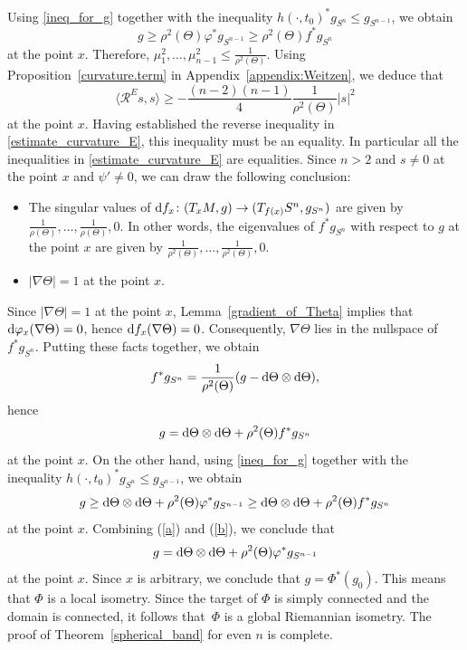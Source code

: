 Using \eqref{ineq_for_g} together with the inequality $h(\cdot,t_0)^* g_{S^n} \leq g_{S^{n-1}}$, we obtain
\[g \geq \rho^2(\Theta) \varphi^* g_{S^{n-1}} \geq \rho^2(\Theta) f^* g_{S^n}\]
at the point $x$.
Therefore, $\mu_1^2,\hdots,\mu_{n-1}^2 \leq \frac{1}{\rho^2(\Theta)}$.
Using Proposition~\ref{curvature.term} in Appendix~\ref{appendix:Weitzen}, we deduce that
\[
 \big\langle \mathcal{R}^E s ,s \big\rangle \geq -\frac{(n-2)(n-1)}{4} \frac{1}{\rho^2(\Theta)} |s|^2
\]
at the point $x$.
Having established the reverse inequality in \eqref{estimate_curvature_E}, this inequality must be an equality.
In particular all the inequalities in \eqref{estimate_curvature_E} are equalities.
Since $n>2$ and $s \neq 0$ at the point $x$ and $\psi'\neq0$, we can draw the following conclusion:
\begin{itemize}\itemsep=0pt
\item The singular values of ${\rm d}f_x\colon (T_x M,g) \to (T_{f(x)} S^n,g_{S^n})$ are given by $\frac{1}{\rho(\Theta)}, \ldots, \frac{1}{\rho(\Theta)}, 0$. In other words, the eigenvalues of $f^* g_{S^n}$ with respect to $g$ at the point $x$ are given by $\frac{1}{\rho^2(\Theta)}, \ldots, \frac{1}{\rho^2(\Theta)}, 0$.
\item $|\nabla \Theta| = 1$ at the point $x$.
\end{itemize}
Since $|\nabla \Theta| = 1$ at the point $x$, Lemma~\ref{gradient_of_Theta} implies that ${\rm d}\varphi_x(\nabla \Theta) = 0$, hence ${\rm d}f_x(\nabla \Theta) = 0$.
Consequently, $\nabla \Theta$ lies in the nullspace of $f^* g_{S^n}$. Putting these facts together, we obtain
\[f^* g_{S^n} = \frac{1}{\rho^2(\Theta)} (g - {\rm d}\Theta \otimes{\rm d}\Theta),\]
hence
\begin{equation}
\label{a}
g = {\rm d}\Theta \otimes {\rm d}\Theta + \rho^2(\Theta) f^* g_{S^n}
\end{equation}
at the point $x$. On the other hand, using \eqref{ineq_for_g} together with the inequality $h(\cdot,t_0)^* g_{S^n} \leq g_{S^{n-1}}$, we obtain
\begin{equation}
\label{b}
g \geq {\rm d}\Theta \otimes {\rm d}\Theta + \rho^2(\Theta) \varphi^* g_{S^{n-1}} \geq {\rm d}\Theta \otimes {\rm d}\Theta + \rho^2(\Theta) f^* g_{S^n}
\end{equation}
at the point $x$. Combining (\ref{a}) and (\ref{b}), we conclude that
\[g = {\rm d}\Theta \otimes {\rm d}\Theta + \rho^2(\Theta) \varphi^* g_{S^{n-1}}\]
at the point $x$. Since $x$ is arbitrary, we conclude that $g= \Phi^*(g_0)$.
This means that $\Phi$ is a local isometry.
Since the target of $\Phi$ is simply connected and the domain is connected, it follows that~$\Phi$ is a global Riemannian isometry.
The proof of Theorem~\ref{spherical_band} for even $n$ is complete.


